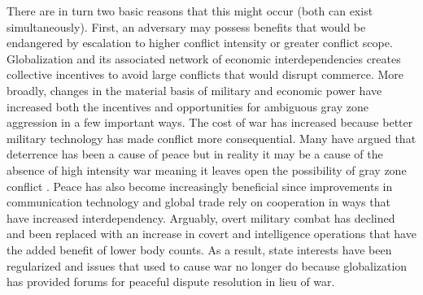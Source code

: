 \documentclass[12pt,letterpaper]{article}
\begin{document}
			There are in turn two basic reasons that this might occur (both can exist simultaneously). First, an adversary may possess benefits that would be endangered by escalation to higher conflict intensity or greater conflict scope. Globalization and its associated network of economic interdependencies creates collective incentives to avoid large conflicts that would disrupt commerce. More broadly, changes in the material basis of military and economic power have increased both the incentives and opportunities for ambiguous gray zone aggression in a few important ways. The cost of war has increased because better military technology has made conflict more consequential. Many have argued that deterrence has been a cause of peace but in reality it may be a cause of the absence of high intensity war meaning it leaves open the possibility of gray zone conflict \citep{rauchhaus_evaluatingnuclearpeace_2009}. Peace has also become increasingly beneficial since improvements in communication technology and global trade rely on cooperation in ways that have increased interdependency. Arguably, overt military combat has declined and been replaced with an increase in covert and intelligence operations that have the added benefit of lower body counts. As a result, state interests have been regularized and issues that used to cause war no longer do because globalization has provided forums for peaceful dispute resolution in lieu of war.
			
\end{document}
